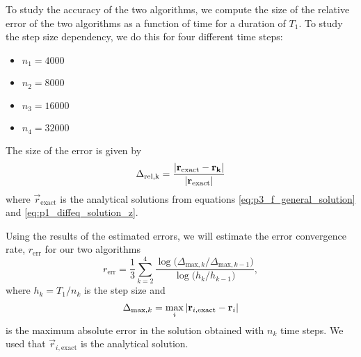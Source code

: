 To study the accuracy of the two algorithms, we compute the size of the relative error of the two algorithms as a function of time for a duration of $T_1$. To study the step size dependency, we do this for four different time steps:
\begin{itemize}
    \item[] $n_1 = 4000$
    \item[] $n_2 = 8000$
    \item[] $n_3 = 16000$
    \item[] $n_4 = 32000$
\end{itemize}
The size of the error is given by 
\begin{equation}\label{eq:relative_error_size}
    \Delta_\mathrm{rel,k} = \frac{\abs{\mathbf{r}_\mathrm{exact} - \mathbf{r_k}}}{\abs{\mathbf{r}_\mathrm{exact}}}
\end{equation}
where $\vec{r}_\mathrm{exact}$ is the analytical solutions from equations \eqref{eq:p3_f_general_solution} and \eqref{eq:p1_diffeq_solution_z}. 




Using the results of the estimated errors, we will estimate the error convergence rate, $r_\mathrm{err}$ for our two algorithms 
\begin{equation}\label{eq:error_convergence_rate}
    r_\mathrm{err} = \frac{1}{3} \sum_{k=2}^{4} \frac{\log{\big(\Delta_{\mathrm{max}, k} /\Delta_{\mathrm{max}, k-1}\big)}}{\log{\big(h_k/h_{k-1} \big)}},
\end{equation}
where $h_k =T_1/n_k$ is the step size and
\begin{equation}\label{eq:abs_error}
    \Delta_{\mathrm{max}, k} = \max_{i}\abs{\mathbf{r}_{i, \mathrm{exact}} - \mathbf{r}_i}
\end{equation}
is the maximum absolute error in the solution obtained with $n_k$ time steps. We used that $\vec{r}_{i, \mathrm{exact}}$ is the analytical solution.

